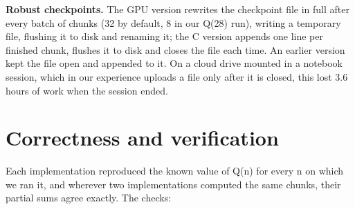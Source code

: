 \textbf{Robust checkpoints.} The GPU version rewrites the checkpoint file in full after every batch of chunks (32 by default, 8 in our Q(28) run), writing a temporary file, flushing it to disk and renaming it; the C version appends one line per finished chunk, flushes it to disk and closes the file each time. An earlier version kept the file open and appended to it. On a cloud drive mounted in a notebook session, which in our experience uploads a file only after it is closed, this lost 3.6 hours of work when the session ended.

\section{Correctness and verification}

Each implementation reproduced the known value of Q(n) for every n on which we ran it, and wherever two implementations computed the same chunks, their partial sums agree exactly. The checks:

